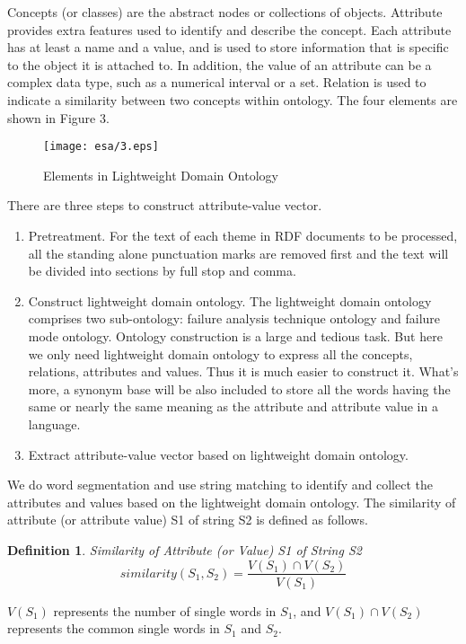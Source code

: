 \documentclass{elsarticle}
\newtheorem{definition}{Definition}
\begin{document}
Concepts (or classes) are the abstract nodes or collections of objects. Attribute provides extra features used to identify and describe the concept. Each attribute has at least a name and a value, and is used to store information that is specific to the object it is attached to. In addition, the value of an attribute can be a complex data type, such as a numerical interval or a set. Relation is used to indicate a similarity between two concepts within ontology. The four elements are shown in Figure 3.
\begin{figure}[htb]
  \centering
  \texttt{[image: esa/3.eps]}
  \caption{Elements in Lightweight Domain Ontology}
\end{figure}
There are three steps to construct attribute-value vector.
\begin{enumerate}
\item Pretreatment. For the text of each theme in RDF documents to be processed, all the standing alone punctuation marks are removed first and the text will be divided into sections by full stop and comma.
\item  Construct lightweight domain ontology. The lightweight domain ontology comprises two sub-ontology: failure analysis technique ontology and failure mode ontology. Ontology construction is a large and tedious task. But here we only need lightweight domain ontology to express all the concepts, relations, attributes and values. Thus it is much easier to construct it. What’s more, a synonym base will be also included to store all the words having the same or nearly the same meaning as the attribute and attribute value in a language. 
\item Extract attribute-value vector based on lightweight domain ontology.

\end{enumerate}

We do word segmentation and use string matching to identify and collect the attributes and values based on the lightweight domain ontology. The similarity of attribute (or attribute value) S1 of string S2 is defined as follows.
\begin{definition}
  Similarity of Attribute (or Value) S1 of String
  S2 \[similarity(S_1,S_2) = \frac{V(S_1) \cap V(S_2)}{V(S_1)} \]

\end{definition}

$V(S_1)$ represents the number of single words in $S_1$, and $V(S_1)
\cap V(S_2)$ represents the common single words in $S_1$ and $S_2$.
\end{document}
